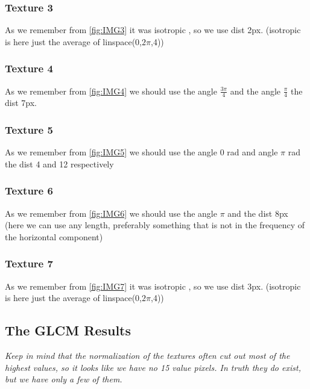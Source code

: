 \documentclass{article}
\begin{document}
	\subsubsection{Texture 3}
		As we remember from \ref{fig:IMG3} it was isotropic , so we use dist 2px. (isotropic is here just the average of linspace(0,$2\pi$,4))\\
	\subsubsection{Texture 4}
		As we remember from \ref{fig:IMG4} we should use the angle $\frac{3\pi}{4}$ and the angle $\frac{\pi}{4}$ the dist 7px.\\
	\subsubsection{Texture 5}
		As we remember from \ref{fig:IMG5} we should use the angle 0 rad and angle $\pi$ rad the dist 4 and 12 respectively\\
	\subsubsection{Texture 6}
		As we remember from \ref{fig:IMG6} we should use the angle $\pi$ and the dist 8px (here we can use any length, preferably something that is not in the frequency of the horizontal component)\\
	\subsubsection{Texture 7}
		As we remember from \ref{fig:IMG7} it was isotropic , so we use dist 3px. (isotropic is here just the average of linspace(0,$2\pi$,4))\\

\subsection{The GLCM Results}
	\setcounter{subsubsection}{-1}
	\textit{Keep in mind that the normalization of the textures often cut out most of the highest values, so it looks like we have no 15 value pixels. In truth they do exist, but we have only a few of them.}	
\end{document}
